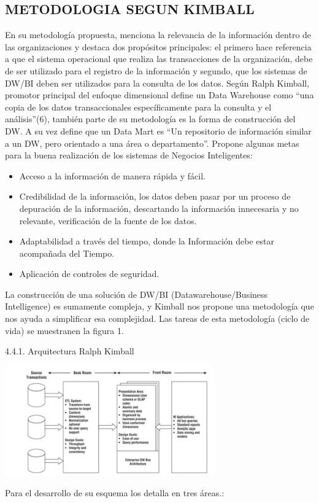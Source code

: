 \documentclass[%
 reprint,
 amsmath,amssymb,
 aps,
]{revtex4-1}
\begin{document}
\subsection{METODOLOGIA SEGUN KIMBALL}	
En su metodología propuesta, menciona la relevancia de la información dentro de las
organizaciones y destaca dos propósitos principales: el primero hace referencia a que
el sistema operacional que realiza las transacciones de la organización, debe de ser
utilizado para el registro de la información y segundo, que los sistemas de DW/BI
deben ser utilizados para la consulta de los datos.
Según Ralph Kimball, promotor principal del enfoque dimensional define un Data
Warehouse como “una copia de los datos transaccionales específicamente para la
consulta y el análisis”(6), también parte de su metodología es la forma de construcción
del DW. A su vez define que un Data Mart es “Un repositorio de información similar a
un DW, pero orientado a una área o departamento”.
Propone algunas metas para la buena realización de los sistemas de Negocios
Inteligentes:


\begin{itemize}
	\item   Acceso a la información de manera rápida y fácil. 
	\item Credibilidad de la información, los datos deben pasar por un proceso de
depuración de la información, descartando la información innecesaria y no
relevante, verificación de la fuente de los datos.
 
	\item Adaptabilidad a través del tiempo, donde la Información debe estar
acompañada del Tiempo.
	\item Aplicación de controles de seguridad.
\end{itemize}

La construcción de una solución de DW/BI (Datawarehouse/Business Intelligence) es sumamente compleja, y Kimball nos propone una metodología que nos ayuda a simplificar esa complejidad. Las tareas de esta metodología (ciclo de vida) se muestranen la figura 1.

			


4.4.1. Arquitectura Ralph Kimball


				\begin{center}
					\includegraphics[width=9cm]{./IMAGENES/arqui}
				\end{center}
Para el desarrollo de su esquema los detalla en tres áreas.:
\end{document}
